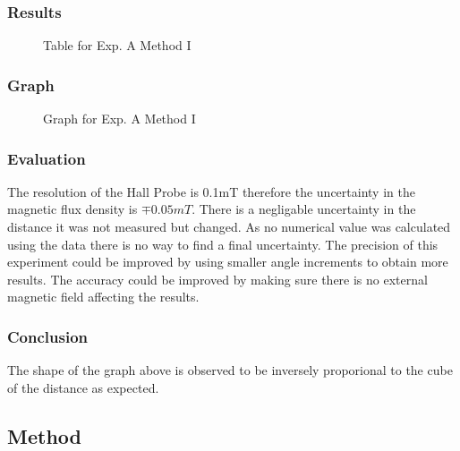 \subsubsection{Results}
\begin{figure}[H]
  \centering
  \caption{Table for Exp. A Method I}
\end{figure}

\subsubsection{Graph}
\begin{figure}[H]
  \centering
  \caption{Graph for Exp. A Method I}
\end{figure}

\subsubsection{Evaluation}
The resolution of the Hall Probe is 0.1mT therefore the uncertainty in the magnetic flux density is $\mp 0.05mT$.
There is a negligable uncertainty in the distance it was not measured but changed.
As no numerical value was calculated using the data there is no way to find a final uncertainty.
The precision of this experiment could be improved by using smaller angle increments to obtain more results.
The accuracy could be improved by making sure there is no external magnetic field affecting the results.

\subsubsection{Conclusion}
The shape of the graph above is observed to be inversely proporional to the cube of the distance as expected.\cite{mille:magnetic}

\subsection{Method}
